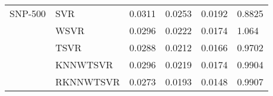 \documentclass[pdflatex,sn-mathphys]{sn-jnl}%
\theoremstyle{thmstyleone}%
\theoremstyle{thmstyletwo}%
\theoremstyle{thmstylethree}%
\begin{document}
\begin{table}[htp]
{\begin{tabular}{p{2.5cm} p{3.2cm}p{2cm}p{2cm}p{2cm}p{2cm}}
SNP-500  & SVR \cite{vapnik1998statistical} & 0.0311  & 0.0253 & 0.0192 & 0.8825  \\
 
  & WSVR \cite{han2014weighted} & 0.0296 & 0.0222 & 0.0174 & 1.064 \\
  
  & TSVR \cite{peng2010tsvr} & 0.0288 & 0.0212 & 0.0166 & 0.9702\\
  
  & KNNWTSVR \cite{xu2014k} & 0.0296 & 0.0219 & 0.0174 & 0.9904\\
  
  & RKNNWTSVR \cite{tanveer2016efficient} & 0.0273 & 0.0193 & 0.0148 & 0.9907 \\
  \hline
  
\hline
\end{tabular}}
\end{table}
\end{document}

